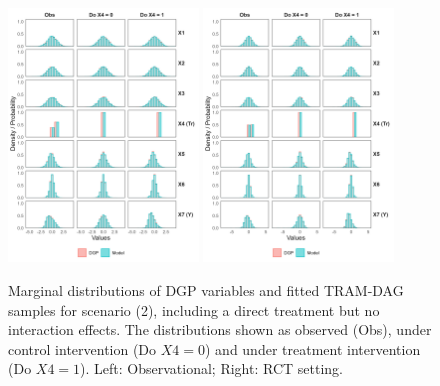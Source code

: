 \begin{figure}[htbp]
\centering
\includegraphics[width=0.45\textwidth]{img/results/observ_scenario2_sampling_distributions_vertical.png}
\includegraphics[width=0.45\textwidth]{img/results/rct_scenario2_sampling_distributions_vertical.png}
\caption{Marginal distributions of DGP variables and fitted TRAM-DAG samples for scenario (2), including a direct treatment but no interaction effects. The distributions shown as observed (Obs), under control intervention (Do $X4=0$) and under treatment intervention (Do $X4=1$). Left: Observational; Right: RCT setting.}
\label{fig:scenario2_sampling_distributions_vertical}
\end{figure}

